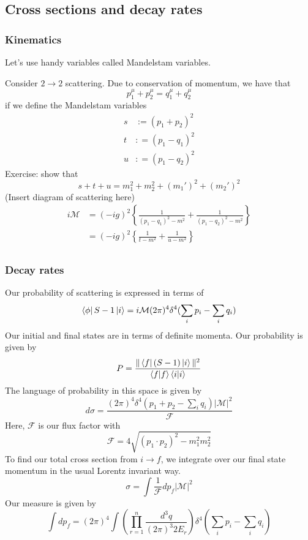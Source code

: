 \subsection{Cross sections and decay rates} 

\subsubsection{Kinematics} 
Let's use handy variables called Mandelstam variables. 

Consider $ 2 \to 2 $ scattering. 
Due to conservation of momentum, we have that 
\[
 p_1 ^ \mu + p_2 ^ \mu = q_ 1 ^ \mu + q_2 ^ \mu 
\] if we define the Mandelstam variables 
\begin{align*}
	s  & := (p_1 + p_2 ) ^ 2 \\
	t & : = ( p_1 - q_1 ) ^ 2 \\
	u & : = ( p_1 - q_2 ) ^ 2 
\end{align*} 
Exercise: show that 
\[
	s + t + u = m_1 ^ 2 + m_2 ^ 2 + ( m_1' )  ^ 2 + ( m_2' )  ^ 2
\] (Insert diagram of scattering here) 
\begin{align*}
	i \mathcal{ M } &=  ( - i g ) ^ 2 \left\{  \frac{1}{ 
	( p_1 - q_1 ) ^2 - m ^ 2 } + \frac{1}{ ( p_1 - q_2) ^ 2 - m^ 2 } \right\}  \\
			&=  ( - i g ) ^ 2 \left\{  \frac{1}{t - m ^ 2 } + \frac{1}{ u - m ^ 2 } \right\}  \\
\end{align*}

\subsubsection{Decay rates} 
Our probability of scattering 
is expressed in terms of 
\[
	\bra{ \phi } S- 1 \ket{ i } = i \mathcal{ M } ( 2 \pi ) ^ 4 
	\delta ^ 4 ( \sum_ i p_ i - \sum_i q_i ) 
\] Our initial and final states 
are in terms of definite momenta. 
Our probability is given by 
\[
	P = \frac{ \| \bra { f} ( S -  1 ) \ket { i } \| ^ 2 }{
	\bra { f} \ket { f} \bra{ i } \ket{ i } }
\] The language of probability in this space is 
given by 
\[
	d \sigma = \frac{ ( 2 \pi ) ^ 4 \delta ^ 4 ( p_1 + p_2 - \sum_ i q _ i ) | \mathcal{M } | ^ 2 }{
	\mathcal{ F }}
\] Here, $ \mathcal{ F } $ is our flux factor with 
\[
	\mathcal{ F } = 4 \sqrt{ ( p_1 \cdot  p_2 ) ^ 2 - m_1^ 2 m_2 ^ 2} 
\] To find our total cross section from $ i \to f $, 
we integrate over our final state momentum in the usual 
Lorentz invariant way. 
 \[
 \sigma = \int \frac{1}{ \mathcal{ F } } d p_{ f } | \mathcal{ M } | ^ 2 
\] Our measure is given by 
\[
	\int d p _{ f } = ( 2 \pi ) ^ 4 \int \left( 
	\prod_{ r = 1 } ^ n \frac{ d^ 3 q }{ ( 2 \pi ) ^ 3 2 E_{ r } }\right) 
	\delta ^ 4 ( \sum_ i p _ i - \sum_ i q_i ) 
\]
